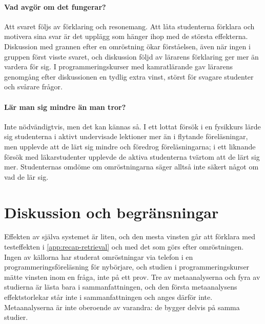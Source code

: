 \paragraph{Vad avgör om det fungerar?}
Att svaret följs av förklaring och resonemang.  Att låta studenterna
förklara och motivera sina svar är det upplägg som hänger ihop med de
största effekterna\autocite{Chien2016Clickers}.  Diskussion med grannen
efter en omröstning ökar förståelsen, även när ingen i gruppen först
visste svaret\autocite{Smith2009PeerDiscussion}, och diskussion följd av
lärarens förklaring ger mer än vardera för
sig\autocite{Smith2011PeerInstructor}.
I programmeringskurser med kamratlärande gav lärarens genomgång efter
diskussionen en tydlig extra vinst, störst för svagare studenter och
svårare frågor\autocite{ZingaroPorter2014}.

\paragraph{Lär man sig mindre än man tror?}
Inte nödvändigtvis, men det kan kännas så.  I ett lottat försök i en
fysikkurs lärde sig studenterna i aktivt undervisade lektioner mer än i
flytande föreläsningar, men upplevde att de lärt sig mindre och föredrog
föreläsningarna\autocite[19251]{Deslauriers2019}; i ett liknande försök
med läkarstudenter upplevde de aktiva studenterna tvärtom att de lärt sig
mer\autocite{Boedeker2025}.  Studenternas omdöme om omröstningarna säger
alltså inte säkert något om vad de lär sig.%

\section{Diskussion och begränsningar}
\label{sec:recap-polls-diskussion}

Effekten av själva systemet är liten, och den mesta vinsten går att
förklara med testeffekten i \cref{app:recap-retrieval} och med det som
görs efter omröstningen.  Ingen av källorna har studerat omröstningar
via telefon i en programmeringsföreläsning för nybörjare, och studien
i programmeringskurser mätte vinsten inom en fråga, inte på ett prov.
Tre av metaanalyserna och fyra av studierna är lästa bara i
sammanfattningen, och den första metaanalysens effektstorlekar står inte
i sammanfattningen och anges därför inte.  Metaanalyserna är inte
oberoende av varandra: de bygger delvis på samma studier.

